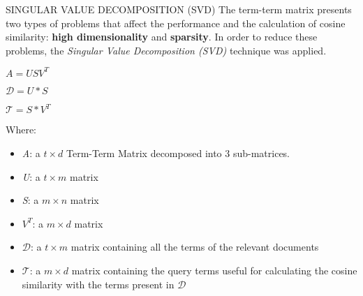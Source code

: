 \begin{frame}{SINGULAR VALUE DECOMPOSITION (SVD)}
    The term-term matrix presents two types of problems that affect the 
    performance and the calculation of cosine similarity: {\bfseries{high 
    dimensionality}} and {\bfseries{sparsity}}. In order to reduce these problems, the 
    \emph{Singular Value Decomposition (SVD)} technique was applied.
    \begin{minipage}{\linewidth}
        \centering
        \begin{minipage}{0.20\linewidth}
            \begin{block}{}
                \centering $ A = USV^T $
            \end{block}
            \begin{block}{}
                \centering $ \mathcal{D} = U*S $
            \end{block}
            \begin{block}{}
                \centering $ \mathcal{T} = S*V^T $
            \end{block}
        \end{minipage}
        \hspace{0.05\linewidth}
        \begin{minipage}{0.60\linewidth}
            Where:
            \begin{itemize}
                \item \emph{A}: a $t\times d$ Term-Term Matrix decomposed into 3 sub-matrices.
                \item \emph{U}: a $t\times m$ matrix
                \item \emph{S}: a $m\times n$ matrix
                \item \emph{$V^T$}: a $m\times d$ matrix
                \item \emph{$\mathcal{D}$}: a $t\times m$ matrix containing all the terms of the relevant documents
                \item \emph{$\mathcal{T}$}: a $m\times d$ matrix containing the query terms useful for calculating the cosine similarity with the terms present in $\mathcal{D}$
            \end{itemize}
        \end{minipage}
    \end{minipage}
\end{frame}

